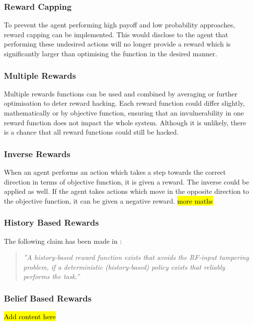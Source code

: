 \subsubsection{Reward Capping}
To prevent the agent performing high payoff and low probability approaches, reward capping can be implemented.
This would disclose to the agent that performing these undesired actions will no longer provide a reward which is significantly larger than optimising the function in the desired manner.

\subsubsection{Multiple Rewards}
Multiple rewards functions can be used and combined by averaging or further optimisation to deter reward hacking.
Each reward function could differ slightly, mathematically or by objective function, ensuring that an invulnerability in one reward function does not impact the whole system.
Although it is unlikely, there is a chance that all reward functions could still be hacked.

\subsubsection{Inverse Rewards}
When an agent performs an action which takes a step towards the correct direction in terms of objective function, it is given a reward.
The inverse could be applied as well. If the agent takes actions which move in the opposite direction to the objective function, it can be given a negative reward.
\hl{more maths}

\subsubsection{History Based Rewards}
The following claim has been made in \cite{DBLP:journals/corr/abs-1908-04734}:
\begin{quote}
    \emph{''A history-based reward function exists that avoids the RF-input tampering
    problem, if a deterministic (history-based) policy exists that reliably performs the task.''}
\end{quote}

\subsubsection{Belief Based Rewards}
\hl{Add content here}


